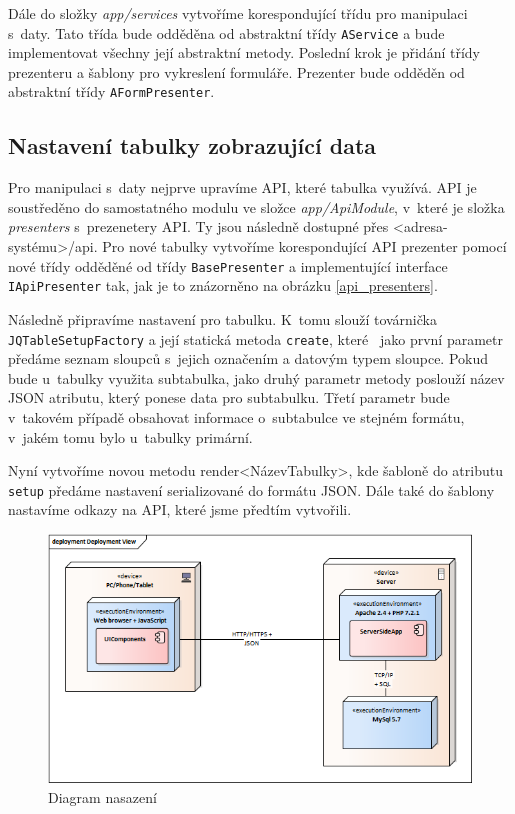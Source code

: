 \documentclass[thesis=B,czech]{FITthesis}[2012/06/26]
\begin{document}
	Dále do složky \emph{app/services} vytvoříme korespondující třídu pro manipulaci s~daty. Tato třída bude odděděna od abstraktní třídy \verb|AService| a bude implementovat všechny její abstraktní metody. Poslední krok je přidání třídy prezenteru a šablony pro vykreslení formuláře. Prezenter bude odděděn od abstraktní třídy \verb|AFormPresenter|.
\subsection{Nastavení tabulky zobrazující data}
	Pro manipulaci s~daty nejprve upravíme API, které tabulka využívá. API je soustředěno do samostatného modulu ve složce \emph{app/ApiModule}, v~které je složka \emph{presenters} s~prezenetery API. Ty jsou následně dostupné přes <adresa-systému>/api. Pro nové tabulky vytvoříme korespondující API prezenter pomocí nové třídy odděděné od třídy \verb|BasePresenter| a implementující interface \verb|IApiPresenter| tak, jak je to znázorněno na obrázku \ref{api_presenters}. 

	Následně připravíme nastavení pro tabulku. K~tomu slouží továrnička \verb|JQTableSetupFactory| a její statická metoda \verb|create|, které ~jako první parametr předáme seznam sloupců s~jejich označením a datovým typem sloupce. Pokud bude u~tabulky využita subtabulka, jako druhý parametr metody poslouží název JSON atributu, který ponese data pro subtabulku. Třetí parametr bude v~takovém případě obsahovat informace o~subtabulce ve stejném formátu, v~jakém tomu bylo u~tabulky primární.

	Nyní vytvoříme novou metodu render<NázevTabulky>, kde šabloně do atributu \verb|setup| předáme nastavení serializované do formátu JSON. Dále také do šablony nastavíme odkazy na API, které jsme předtím vytvořili.

\begin{figure}
	\includegraphics[width=\textwidth]{Deployment_view.png}
	\caption{Diagram nasazení}\label{deployment_view}
\end{figure}
\end{document}
